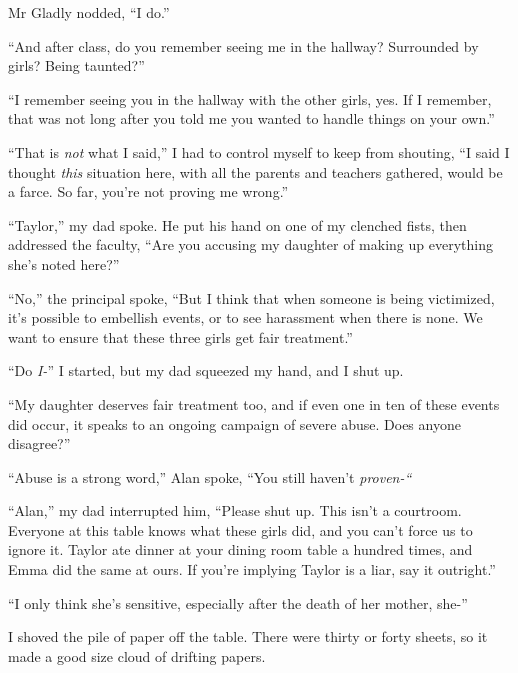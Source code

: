 Mr Gladly nodded, ``I do.''



``And after class, do you remember seeing me in the hallway?  Surrounded by girls?  Being taunted?''



``I remember seeing you in the hallway with the other girls, yes.  If I remember, that was not long after you told me you wanted to handle things on your own.''



``That is \emph{not} what I said,'' I had to control myself to keep from shouting, ``I said I thought \emph{this} situation here, with all the parents and teachers gathered, would be a farce.  So far, you're not proving me wrong.''



``Taylor,'' my dad spoke.  He put his hand on one of my clenched fists, then addressed the faculty, ``Are you accusing my daughter of making up everything she's noted here?''



``No,'' the principal spoke, ``But I think that when someone is being victimized, it's possible to embellish events, or to see harassment when there is none.  We want to ensure that these three girls get fair treatment.''



``Do \emph{I-}'' I started, but my dad squeezed my hand, and I shut up.



``My daughter deserves fair treatment too, and if even one in ten of these events did occur, it speaks to an ongoing campaign of severe abuse.  Does anyone disagree?''



``Abuse is a strong word,'' Alan spoke, ``You still haven't \emph{proven-``}



``Alan,'' my dad interrupted him, ``Please shut up.  This isn't a courtroom.  Everyone at this table knows what these girls did, and you can't force us to ignore it.  Taylor ate dinner at your dining room table a hundred times, and Emma did the same at ours.  If you're implying Taylor is a liar, say it outright.''



``I only think she's sensitive, especially after the death of her mother, she-''



I shoved the pile of paper off the table.  There were thirty or forty sheets, so it made a good size cloud of drifting papers.




